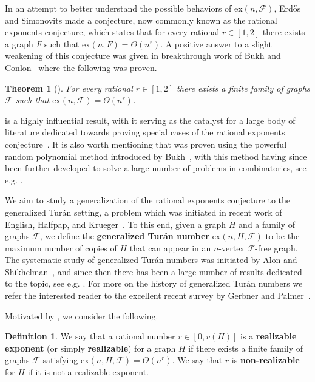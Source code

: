 \documentclass[12pt,letterpaper]{article}
\newtheorem{theorem}{Theorem}[section]
\theoremstyle{definition}
\newtheorem{definition}{Definition}
\newcommand{\re}{r} %
\newcommand{\ex}{\mathrm{ex}}
\renewcommand{\c}[1]{\mathcal{#1}}
\begin{document}
	In an attempt to better understand the possible behaviors of $\ex(n,\c{F})$, Erd\H{o}s and Simonovits made a conjecture, now commonly known as the rational exponents conjecture, which states that for every rational $\re\in [1,2]$ there exists a graph $F$ such that $\ex(n,F)=\Theta(n^\re)$.  A positive answer to a slight weakening of this conjecture was given  in breakthrough work of Bukh and Conlon~\cite{BC2018} where the following was proven.
	
	\begin{theorem}[\cite{BC2018}]\label{theorem bukh conlon}
		For every rational $\re\in [1,2]$ there exists a finite family of graphs $\c{F}$ such that $\ex(n,\c{F})=\Theta(n^r)$.
	\end{theorem}
	
	 is a highly influential result, with it serving as the catalyst for a large body of literature dedicated towards proving special cases of the rational exponents conjecture~\cite{E1981}.  It is also worth mentioning that  was proven using the powerful random polynomial method introduced  by Bukh~\cite{B2015}, with this method having since been further developed to solve a large number of problems in combinatorics, see e.g. \cite{BKN2022, CPZ2021, CT2021, F2019, KLZ2024, ST2024}.
	
	We aim to study a generalization of the rational exponents conjecture to the generalized Tur\'an setting, a problem which was initiated in recent work of English, Halfpap, and Krueger~\cite{EHK2025}.  To this end, given a graph $H$ and a family of graphs $\c{F}$, we define the \textbf{generalized Tur\'an number} $\ex(n,H,\c{F})$ to be the maximum number of copies of $H$ that can appear in an $n$-vertex $\c{F}$-free graph.  The systematic study of generalized Tur\'an numbers was initiated by Alon and Shikhelman~\cite{AS2016}, and since then there has been a large number of results dedicated to the topic, see e.g. \cite{GGMV2020, GP2022, HP2021, MYZ2018, ZGHLSX2023}.  For more on the history of generalized Tur\'an numbers we refer the interested reader to the excellent recent survey by Gerbner and Palmer~\cite{GP2025}.  
	
	Motivated by , we consider the following.
	
	\begin{definition}
		We say that a rational number $\re\in [0,v(H)]$ is a \textbf{realizable exponent} (or simply \textbf{realizable}) for a graph $H$ if there exists a finite family of graphs $\c{F}$ satisfying $\ex(n,H,\c{F})=\Theta(n^\re)$.  We say that $\re$ is \textbf{non-realizable} for $H$ if it is not a realizable exponent.
	\end{definition}
	
\end{document}
